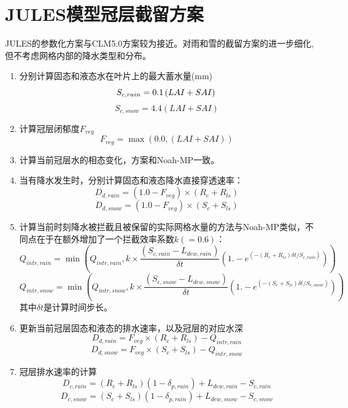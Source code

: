 \section{JULES模型冠层截留方案}
JULES的参数化方案与CLM5.0方案较为接近。对雨和雪的截留方案的进一步细化,但不考虑网格内部的降水类型和分布。
\begin{enumerate}
\item 分别计算固态和液态水在叶片上的最大蓄水量(mm)\\
\begin{equation}
S_{c,rain}=0.1\left(LAI+SAI\right)\\
\end{equation}
\begin{equation}
S_{c,snow}=4.4\left(LAI+SAI\right)
\end{equation}
\item 计算冠层闭郁度$F_{veg}$
\begin{equation}
F_{veg} = \max(0.0,\left(LAI+SAI\right))
\end{equation}

\item 计算当前冠层水的相态变化，方案和Noah-MP一致。

\item 当有降水发生时，分别计算固态和液态降水直接穿透速率：
\begin{equation}
D_{d,rain}=\left(1.0-F_{veg}\right) \times (R_{c}+R_{ls})
\end{equation}
\begin{equation}
D_{d,snow}=\left(1.0-F_{veg}\right) \times (S_{c}+S_{ls})
\end{equation}
\item 计算当前时刻降水被拦截且被保留的实际网格水量的方法与Noah-MP类似，不同点在于在额外增加了一个拦截效率系数$k(=0.6)$：
\begin{equation}
Q_{intr,rain} = \min(Q_{intr,rain},  k \times \frac{(S_{c,rain} - L_{dew,rain})}{\delta{t}}  (1.-e^{(-\left(R_{c}+R_{ls}\right)\delta{t}/S_{c,rain})}) )
\end{equation}
\begin{equation}
Q_{intr,snow} = \min(Q_{intr,snow}, k \times \frac{(S_{c,snow} - L_{dew,snow})}{\delta{t}} (1.-e^{(-\left(S_{c}+S_{ls}\right)\delta{t}/S_{c,snow})}) )
\end{equation}
其中${\delta{t}}$是计算时间步长。
\item 更新当前冠层固态和液态的排水速率，以及冠层的对应水深
\begin{equation}
D_{d,rain}=F_{veg} \times (R_{c}+R_{ls})-Q_{intr,rain}
\end{equation}
\begin{equation}
D_{d,snow}=F_{veg} \times (S_{c}+S_{ls})-Q_{intr,snow}
\end{equation}
\item 冠层排水速率的计算
\begin{equation}
D_{c,rain}=\left(R_{c}+R_{ls}\right)\left(1-\delta_{p,rain}\right)+L_{dew,rain}-S_{c,rain}
\end{equation}
\begin{equation}
D_{c,snow}=\left(S_{c}+S_{ls}\right)\left(1-\delta_{p,rain}\right)+L_{dew,snow}-S_{c,snow}
\end{equation}

\end{enumerate}






